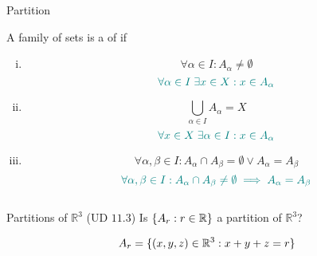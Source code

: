 \begin{frame}{}
  \centerline{\LARGE Partition}

  \vspace{0.60cm}
\end{frame}

\begin{frame}{}
  \begin{definition}[Partition]
    A family of sets  is a  of  if

    \begin{enumerate}[(i)]
      \item 
	\[
	  \forall \alpha \in I: A_{\alpha} \neq \emptyset
	\]
	\[
	  \textcolor{teal}{\forall \alpha \in I \; \exists x \in X: x \in A_{\alpha}}
	\]
      \item 
	\[
	  \bigcup_{\alpha \in I} A_{\alpha} = X
	\]
	\[
	  \textcolor{teal}{\forall x \in X \; \exists \alpha \in I: x \in A_{\alpha}}
	\]
      \item 
	\[
	  \forall \alpha, \beta \in I: A_{\alpha} \cap A_{\beta} = \emptyset \lor A_{\alpha} = A_{\beta}
	\]
	\[
	  \textcolor{teal}{\forall \alpha, \beta \in I: A_{\alpha} \cap A_{\beta} \neq \emptyset \implies A_{\alpha} = A_{\beta}}
	\]
    \end{enumerate}
  \end{definition}
\end{frame}

\begin{frame}{}
  \begin{columns}
      \pause
  \end{columns}
\end{frame}

\begin{frame}{}
  \begin{exampleblock}{Partitions of $\mathbb{R}^{3}$ (UD $11.3$)}
    Is $\{A_r: r \in \mathbb{R}\}$ a partition of $\mathbb{R}^{3}$?

    \[
      A_{r} = \{(x,y,z) \in \mathbb{R}^{3}: x + y + z = r\}
    \]
  \end{exampleblock}

  \pause
\end{frame}

